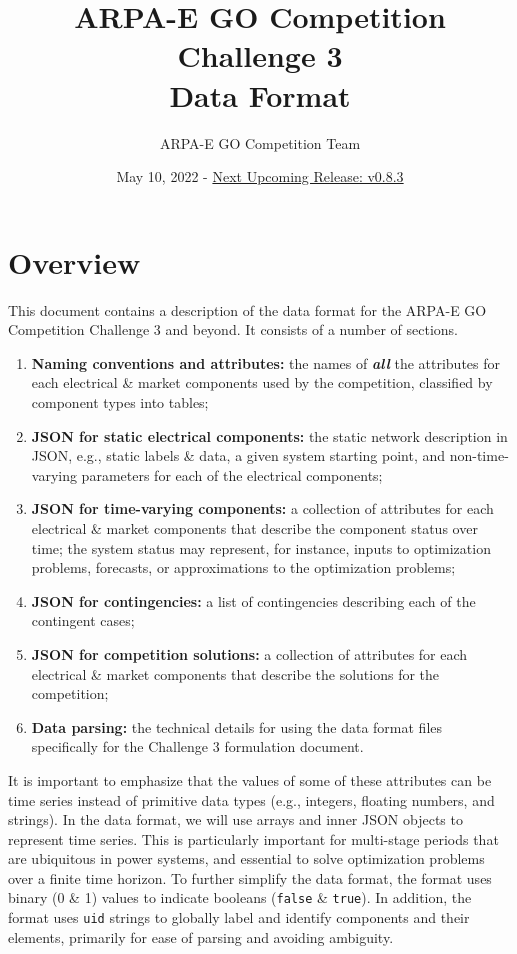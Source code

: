 \documentclass{article}
\title{ARPA-E GO Competition Challenge 3 \\ Data Format}
\author{ARPA-E GO Competition Team}
\date{May 10, 2022 - \underline{Next Upcoming Release: v0.8.3}}
\begin{document}
\maketitle





\section{Overview}

This document contains a description of the data format for the ARPA-E GO Competition Challenge 3 and beyond. It consists of a number of sections.
\begin{enumerate}[I]
    \item {\bf Naming conventions and attributes:} the names of \textit{\textbf{all}} the attributes for each electrical \& market components used by the competition, classified by component types into tables;

    \item {\bf JSON for static electrical components:} the static network description in JSON, e.g., static labels \& data, a given system starting point, and non-time-varying parameters for each of the electrical components;

    \item {\bf JSON for time-varying components:} a collection of attributes for each electrical \& market components that describe the component status over time; the system status may represent, for instance, inputs to optimization problems,  forecasts, or approximations to the optimization problems;
    \item {\bf JSON for contingencies:} a list of contingencies describing each of the contingent cases;
    \item {\bf JSON for competition solutions:} a collection of attributes for each electrical \& market components that describe the solutions for the competition;
     \item {\bf Data parsing:}
     the technical details for using the data format files specifically for the Challenge 3 formulation document.
\end{enumerate}
It is important to emphasize that the values of some of these attributes can be time series instead of primitive data types (e.g., integers, floating numbers, and strings).
In the data format, we will use arrays and inner JSON objects to represent time series.
This is particularly important for multi-stage periods that are ubiquitous in power systems, and essential
to solve optimization problems over a finite time horizon.
To further simplify the data format, the format uses binary (0 \& 1) values to indicate booleans (\texttt{false} \& \texttt{true}).
In addition, the format uses \texttt{uid} strings to globally label and identify components and their elements, primarily for ease of parsing and avoiding ambiguity. 
\end{document}
